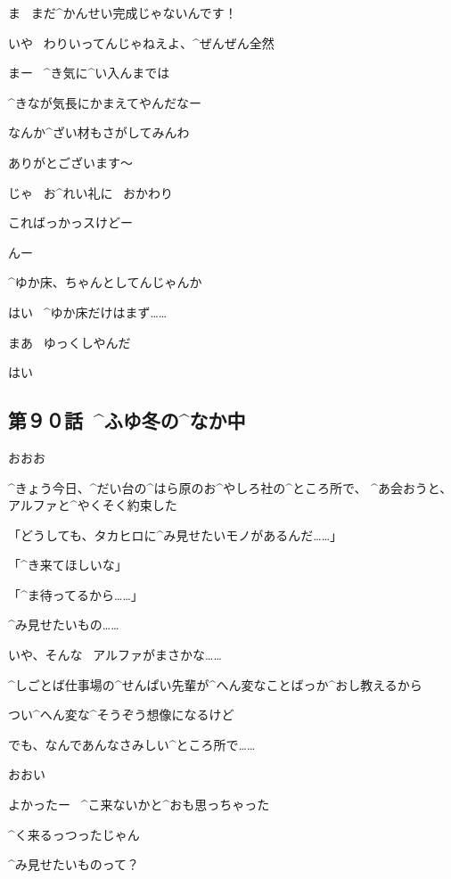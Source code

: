 \Alpha ま
\ まだ^{かんせい}{完成}じゃないんです！

\Ojisan いや
\ わりいってんじゃねえよ、^{ぜんぜん}{全然}

\Ojisan まー
\ ^{き}{気}に^{い}{入}んまでは

\Ojisan ^{きなが}{気長}にかまえてやんだなー

\Ojisan なんか^{ざい}{材}もさがしてみんわ

\Alpha ありがとございます〜

\page[12]
\Alpha じゃ
\ お^{れい}{礼}に
\ おかわり

\Alpha こればっかっスけどー

\Ojisan んー

\page[13]
\Ojisan ^{ゆか}{床}、ちゃんとしてんじゃんか

\Alpha はい
\ ^{ゆか}{床}だけはまず……

\page[14]
\Ojisan まあ
\ ゆっくしやんだ

\Alpha はい


\subsection{第９０話\ ^{ふゆ}{冬}の^{なか}{中}}

\page[19]
\Alpha おおお

\page[20]
\Takahiro ^{きょう}{今日}、^{だい}{台}の^{はら}{原}のお^{やしろ}{社}の^{ところ}{所}で、
^{あ}{会}おうと、アルファと^{やくそく}{約束}した

\Alpha 「どうしても、タカヒロに^{み}{見}せたいモノがあるんだ……」

\Alpha 「^{き}{来}てほしいな」

\Alpha 「^{ま}{待}ってるから……」

\Takahiro ^{み}{見}せたいもの……

\page[21]
\Takahiro いや、そんな
\ アルファがまさかな……

\Takahiro ^{しごとば}{仕事場}の^{せんぱい}{先輩}が^{へん}{変}なことばっか^{おし}{教}えるから

\Takahiro つい^{へん}{変}な^{そうぞう}{想像}になるけど

\Takahiro でも、なんであんなさみしい^{ところ}{所}で……

\page[23]
\Alpha おおい

\Alpha よかったー
\ ^{こ}{来}ないかと^{おも}{思}っちゃった

\Takahiro ^{く}{来}るっつったじゃん

\page[24]
\Takahiro ^{み}{見}せたいものって？

